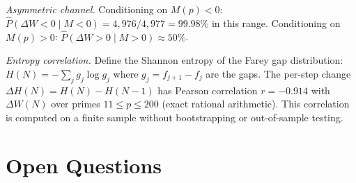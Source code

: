 \documentclass[11pt]{article}
\theoremstyle{definition}
\begin{document}
\emph{Asymmetric channel.}
Conditioning on $M(p) < 0$: $\hat{P}(\Delta W < 0 \mid M < 0)
= 4{,}976/4{,}977 = 99.98\%$ in this range.
Conditioning on $M(p) > 0$: $\hat{P}(\Delta W > 0 \mid M > 0)
\approx 50\%$.

\emph{Entropy correlation.}
Define the Shannon entropy of the Farey gap distribution:
$H(N) = -\sum_{j} g_j \log g_j$ where $g_j = f_{j+1} - f_j$
are the gaps.  The per-step change $\Delta H(N) = H(N) - H(N-1)$
has Pearson correlation $r = -0.914$ with $\Delta W(N)$ over
primes $11 \le p \le 200$ (exact rational arithmetic).
This correlation is computed on a finite sample without
bootstrapping or out-of-sample testing.


\section{Open Questions}\label{sec:open}
\end{document}
